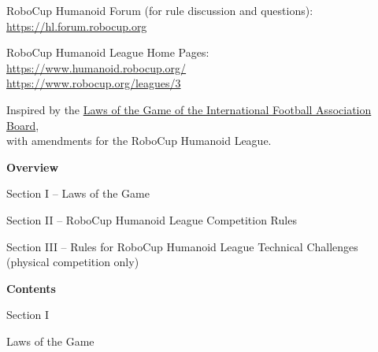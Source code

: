 \documentclass[a4paper]{article}
\begin{document}
    \medskip
    RoboCup Humanoid Forum (for rule discussion and questions):\\
    \url{https://hl.forum.robocup.org}

    \medskip
    RoboCup Humanoid League Home Pages:\\
    \url{https://www.humanoid.robocup.org/}\\
    \url{https://www.robocup.org/leagues/3}

    \medskip
    Inspired by the \href{https://resources.fifa.com/image/upload/laws-of-the-game-2018-19.pdf?cloudid=khhloe2xoigyna8juxw3}{\textcolor[rgb]{0,0,0.5}{Laws of the Game of the International Football Association Board}},\\
    with amendments for the RoboCup Humanoid League.

    \setcounter{figure}{0}

    \clearpage

    {\bfseries\color[rgb]{0.4,0.4,0.4}
    Overview}

    \bigskip

    Section I -- Laws of the Game

    \bigskip

    Section II -- RoboCup Humanoid League Competition Rules
    
    \bigskip

    Section III -- Rules for RoboCup Humanoid League Technical Challenges (physical competition only)


    \clearpage

    {\bfseries\color[rgb]{0.4,0.4,0.4}
    Contents}

    \renewcommand\contentsname{}
    \vspace*{-1cm}
    \tableofcontents



    \clearpage

    \begin{center}
        \Huge\bfseries{
            \vspace*{3cm}
            Section I

            \vspace*{2cm}

            Laws of the Game}
    \end{center}
\end{document}
